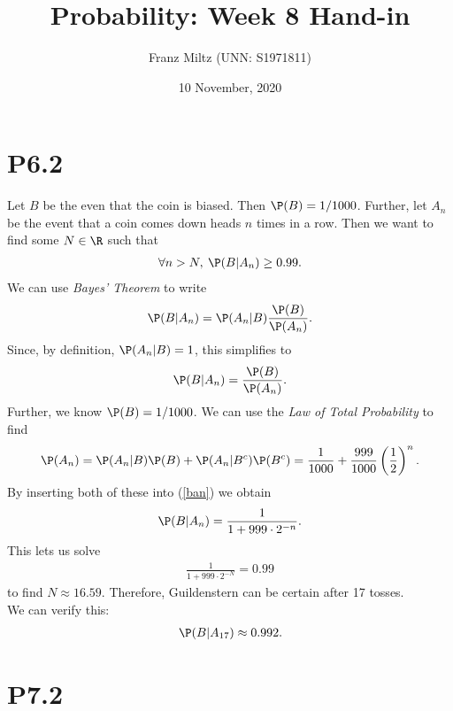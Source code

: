\documentclass{article}
\begin{document}
\title{Probability: Week 8 Hand-in}
\author{Franz Miltz (UNN: S1971811)}
\date{10 November, 2020}
\maketitle


\section*{P6.2}


Let $B$ be the even that the coin is biased. Then $\P(B)=1/1000$. Further,
let $A_n$ be the event that a coin comes down heads $n$ times in a row.
Then we want to find some $N\in\R$ such that
\begin{align*}
  \forall n > N,\: \P(B|A_n)\geq 0.99.
\end{align*}
We can use \emph{Bayes' Theorem} to write
\begin{align*}
  \P(B|A_n) = \P(A_n|B)\frac{\P(B)}{\P(A_n)}.
\end{align*}
Since, by definition, $\P(A_n|B)=1$, this simplifies to
\begin{align}
  \label{ban}
  \P(B|A_n) = \frac{\P(B)}{\P(A_n)}.
\end{align}
Further, we know $\P(B)=1/1000$. We can use the \emph{Law of Total
  Probability} to find
\begin{align*}
  \P(A_n)=\P(A_n|B)\P(B) + \P(A_n|B^c)\P(B^c)
  =\frac{1}{1000}+\frac{999}{1000}\left(\frac{1}{2}\right)^n.
\end{align*}
By inserting both of these into (\ref{ban}) we obtain
\begin{align*}
  \P(B|A_n) = \frac{1}{1+999\cdot 2^{-n}}.
\end{align*}
This lets us solve
\begin{align*}
  \frac{1}{1+999\cdot 2^{-N}} = 0.99
\end{align*}
to find $N\approx 16.59$. Therefore, Guildenstern can be certain after
17 tosses.\\
We can verify this:
\begin{align*}
  \P(B|A_{17}) \approx 0.992.
\end{align*}


\section*{P7.2}
\end{document}
